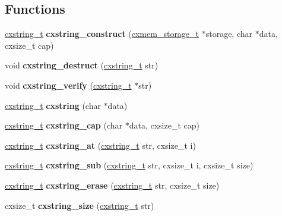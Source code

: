 \subsection*{Functions}
\begin{DoxyCompactItemize}
\item 
\mbox{\label{a00026_aaf0291b3f4784ea60a958af062950e6b}} 
\hyperlink{a00072}{cxstring\+\_\+t} {\bfseries cxstring\+\_\+construct} (\hyperlink{a00056}{cxmem\+\_\+storage\+\_\+t} $\ast$storage, char $\ast$data, cxsize\+\_\+t cap)
\item 
\mbox{\label{a00026_aba7437afb6d8f85f32d47c018716043e}} 
void {\bfseries cxstring\+\_\+destruct} (\hyperlink{a00072}{cxstring\+\_\+t} str)
\item 
\mbox{\label{a00026_ade4838a89cc9e461f4b4bd6e3c6fbe93}} 
void {\bfseries cxstring\+\_\+verify} (\hyperlink{a00072}{cxstring\+\_\+t} $\ast$str)
\item 
\mbox{\label{a00026_abb8c6b1fe4ae233af6c87658cf80dd30}} 
\hyperlink{a00072}{cxstring\+\_\+t} {\bfseries cxstring} (char $\ast$data)
\item 
\mbox{\label{a00026_a5d6cd107391b8ee47c8c8ce0c69a8e23}} 
\hyperlink{a00072}{cxstring\+\_\+t} {\bfseries cxstring\+\_\+cap} (char $\ast$data, cxsize\+\_\+t cap)
\item 
\mbox{\label{a00026_a6999a363dd1b66b6f9624f8d8db70a4a}} 
\hyperlink{a00072}{cxstring\+\_\+t} {\bfseries cxstring\+\_\+at} (\hyperlink{a00072}{cxstring\+\_\+t} str, cxsize\+\_\+t i)
\item 
\mbox{\label{a00026_a2e16727bc4fc1def1ee115678e86291e}} 
\hyperlink{a00072}{cxstring\+\_\+t} {\bfseries cxstring\+\_\+sub} (\hyperlink{a00072}{cxstring\+\_\+t} str, cxsize\+\_\+t i, cxsize\+\_\+t size)
\item 
\mbox{\label{a00026_af47d5df170c3b7063fd201986ae19f8e}} 
\hyperlink{a00072}{cxstring\+\_\+t} {\bfseries cxstring\+\_\+erase} (\hyperlink{a00072}{cxstring\+\_\+t} str, cxsize\+\_\+t size)
\item 
\mbox{\label{a00026_a09a551e9c1462b544fd5fdee0643d97f}} 
cxsize\+\_\+t {\bfseries cxstring\+\_\+size} (\hyperlink{a00072}{cxstring\+\_\+t} str)

\end{DoxyCompactItemize}
